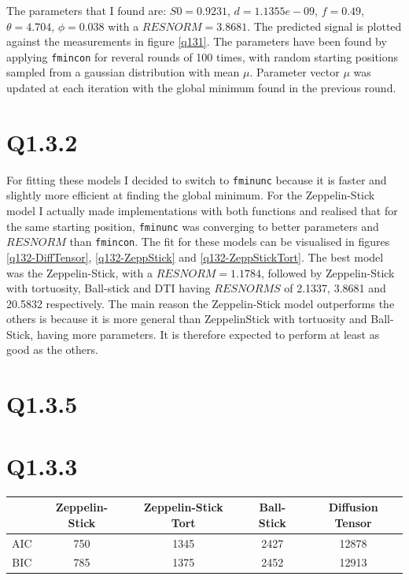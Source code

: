 \documentclass[11pt,a4paper,oneside]{report}
\begin{document}
The parameters that I found are: $S0=0.9231$, $d=1.1355e-09$, $f=0.49$, $\theta=4.704$, $\phi=0.038$ with a $RESNORM=3.8681$. The predicted signal is plotted against the measurements in figure \ref{q131}. The parameters have been found by applying \texttt{fmincon} for reveral rounds of 100 times, with random starting positions sampled from a gaussian distribution with mean $\mu$. Parameter vector $\mu$ was updated at each iteration with the global minimum found in the previous round.

\section*{Q1.3.2}
For fitting these models I decided to switch to \texttt{fminunc} because it is faster and slightly more efficient at finding the global minimum. For the Zeppelin-Stick model I actually made implementations with both functions and realised that for the same starting position, \texttt{fminunc} was converging to better parameters and $RESNORM$ than \texttt{fmincon}. The fit for these models can be visualised in figures \ref{q132-DiffTensor}, \ref{q132-ZeppStick} and \ref{q132-ZeppStickTort}. The best model was the Zeppelin-Stick, with a $RESNORM=1.1784$, followed by Zeppelin-Stick with tortuosity, Ball-stick and DTI having $RESNORMS$ of 2.1337, 3.8681 and 20.5832 respectively. The main reason the Zeppelin-Stick model outperforms the others is because it is more general than ZeppelinStick with tortuosity and Ball-Stick, having more parameters. It is therefore expected to perform at least as good as the others.


\section*{Q1.3.5}


\section*{Q1.3.3}

\begin{center}
\begin{tabular}{c | c | c | c | c}
& Zeppelin-Stick & Zeppelin-Stick Tort & Ball-Stick & Diffusion Tensor\\
\hline
AIC & 750 & 1345 & 2427 & 12878\\
BIC & 785 & 1375 & 2452 & 12913\\
\end{tabular}
\end{center}
\end{document}
